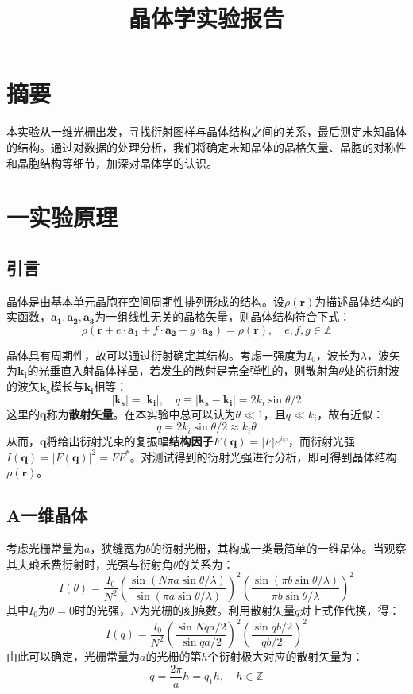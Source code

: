 \documentclass{ctexart}
\title{晶体学实验报告}
\begin{document}
\maketitle

\section*{摘要}
本实验从一维光栅出发，寻找衍射图样与晶体结构之间的关系，最后测定未知晶体的结构。通过对数据的处理分析，我们将确定未知晶体的晶格矢量、晶胞的对称性和晶胞结构等细节，加深对晶体学的认识。


\section*{一\quad 实验原理}
\subsection*{引言}
晶体是由基本单元晶胞在空间周期性排列形成的结构。设$\rho(\bm{r})$为描述晶体结构的实函数，$\bm{a_1},\bm{a_2},\bm{a_3}$为一组线性无关的晶格矢量，则晶体结构符合下式：
\begin{equation}
  \rho(\bm{r}+e\cdot \bm{a_1}+f\cdot \bm{a_2}+g\cdot \bm{a_3})=\rho(\bm{r}),\quad e,f,g\in \mathbb{Z}
\end{equation}

晶体具有周期性，故可以通过衍射确定其结构。考虑一强度为$I_0$，波长为$\lambda$，波矢为$\bm{k_i}$的光垂直入射晶体样品，若发生的散射是完全弹性的，则散射角$\theta$处的衍射波的波矢$\bm{k_s}$模长与$\bm{k_i}$相等：
\begin{equation}
  |\bm{k_s}|=|\bm{k_i}|,\quad q\equiv |\bm{k_s}-\bm{k_i}|=2k_i\sin\theta/2
\end{equation}
这里的$\bm{q}$称为\textbf{散射矢量}。在本实验中总可以认为$\theta \ll 1$，且$q \ll k_i$，故有近似：
\begin{equation}
  q=2k_i\sin\theta/2\approx k_i\theta
\end{equation}
从而，$\bm{q}$将给出衍射光束的复振幅\textbf{结构因子}$F(\bm{q})=|F|e^{i\varphi}$，而衍射光强$I(\bm{q})=|F(\bm{q})|^2=FF^*$。对测试得到的衍射光强进行分析，即可得到晶体结构$\rho(\bm{r})$。
\subsection*{A\quad 一维晶体}
考虑光栅常量为$a$，狭缝宽为$b$的衍射光栅，其构成一类最简单的一维晶体。当观察其夫琅禾费衍射时，光强与衍射角$\theta$的关系为：
\begin{equation}
  I(\theta)=\frac{I_0}{N^2}\left(\frac{\sin(N\pi a\sin\theta/\lambda)}{\sin{(\pi a\sin\theta/\lambda)}}\right)^2\left(\frac{\sin(\pi b\sin\theta/\lambda)}{\pi b\sin\theta/\lambda}\right)^2
\end{equation}
其中$I_0$为$\theta=0$时的光强，$N$为光栅的刻痕数。利用散射矢量$q$对上式作代换，得：
\begin{equation}
  I(q)=\frac{I_0}{N^2}\left(\frac{\sin Nqa/2}{\sin{qa/2}}\right)^2\left(\frac{\sin{qb/2}}{qb/2}\right)^2
\end{equation}
由此可以确定，光栅常量为$a$的光栅的第$h$个衍射极大对应的散射矢量为：
\begin{equation}
  q=\frac{2\pi }{a}h=q_1h,\quad h\in \mathbb{Z} 
\end{equation}
\end{document}

